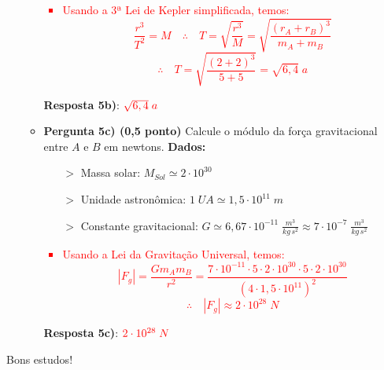 \documentclass[a4paper, 12pt]{article}
\newcommand{\red}[1]
{
	\textcolor{red}{#1}
}
\begin{document}
\begin{flushleft}
\begin{itemize}
\begin{itemize}
					\red{\begin{itemize}
						\item Usando a 3ª Lei de Kepler simplificada, temos:
							$$\frac{r^3}{T^2} = M \quad \therefore \quad T = \sqrt{\frac{r^3}{M}} = \sqrt{\frac{(r_A+r_B)^3}{m_A+m_B}}$$
							$$\therefore \quad T = \sqrt{\frac{(2+2)^3}{5+5}} = \sqrt{6,4} \; a$$
					\end{itemize}}
					\textbf{Resposta 5b)}: $\red{\sqrt{6,4} \; a}$
				\item \textbf{Pergunta 5c) (0,5 ponto)} Calcule o módulo da força gravitacional entre $A$ e $B$ em newtons. \linebreak
					\textbf{Dados:}
						\begin{itemize}
							\item[$>$] Massa solar: $M_{Sol} \simeq 2 \cdot 10^{30}$
							\item[$>$] Unidade astronômica: $1 \; UA \simeq 1,5 \cdot 10^{11} \; m$
							\item[$>$] Constante gravitacional: $G \simeq 6,67 \cdot 10^{-11} \; \frac{m^3}{kg \, s^2} \approx 7 \cdot 10^{-7} \; \frac{m^3}{kg \, s^2}$
						\end{itemize}
						\red{\begin{itemize}
							\item Usando a Lei da Gravitação Universal, temos:
								$$|F_g| = \frac{Gm_Am_B}{r^2} = \frac{7 \cdot 10^{-11} \cdot 5 \cdot 2 \cdot 10^{30} \cdot 5 \cdot 2 \cdot 10^{30}}{(4 \cdot 1,5 \cdot 10^{11})^2}$$
								$$\therefore \quad |F_g| \approx 2 \cdot 10^{28} \; N$$
						\end{itemize}}
					\textbf{Resposta 5c)}: $\red{2 \cdot 10^{28} \; N}$
			\end{itemize}
	\end{itemize}
	\end{flushleft}
	\begin{flushright}
		\begin{large}
			Bons estudos!
		\end{large}
	\end{flushright}
\end{document}
